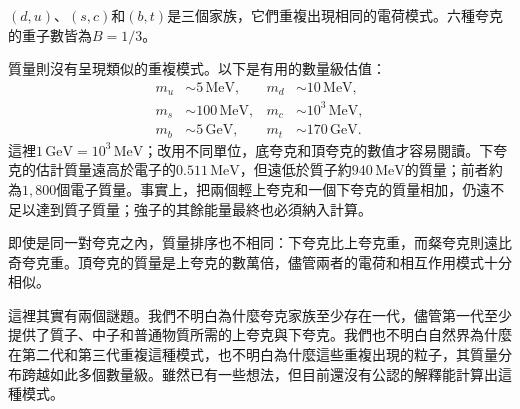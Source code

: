 \((d,u)\)、\((s,c)\)和\((b,t)\)是三個家族，它們重複出現相同的電荷模式。六種夸克的重子數皆為\(B=1/3\)。

\begin{classroomqa}
\end{classroomqa}

質量則沒有呈現類似的重複模式。以下是有用的數量級估值：
\begin{align}
m_u &\sim 5\,\mathrm{MeV},
&
m_d &\sim 10\,\mathrm{MeV},
\\
m_s &\sim 100\,\mathrm{MeV},
&
m_c &\sim 10^3\,\mathrm{MeV},
\\
m_b &\sim 5\,\mathrm{GeV},
&
m_t &\sim 170\,\mathrm{GeV}.
\end{align}
這裡\(1\,\mathrm{GeV}=10^3\,\mathrm{MeV}\)；改用不同單位，底夸克和頂夸克的數值才容易閱讀。下夸克的估計質量遠高於電子的\(0.511\,\mathrm{MeV}\)，但遠低於質子約\(940\,\mathrm{MeV}\)的質量；前者約為\(1{,}800\)個電子質量。事實上，把兩個輕上夸克和一個下夸克的質量相加，仍遠不足以達到質子質量；強子的其餘能量最終也必須納入計算。


即使是同一對夸克之內，質量排序也不相同：下夸克比上夸克重，而粲夸克則遠比奇夸克重。頂夸克的質量是上夸克的數萬倍，儘管兩者的電荷和相互作用模式十分相似。

這裡其實有兩個謎題。我們不明白為什麼夸克家族至少存在一代，儘管第一代至少提供了質子、中子和普通物質所需的上夸克與下夸克。我們也不明白自然界為什麼在第二代和第三代重複這種模式，也不明白為什麼這些重複出現的粒子，其質量分布跨越如此多個數量級。雖然已有一些想法，但目前還沒有公認的解釋能計算出這種模式。

\begin{classroomqa}
\end{classroomqa}

\begin{classroomqa}
\end{classroomqa}

